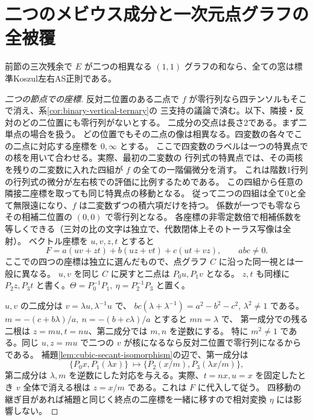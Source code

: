\section{二つのメビウス成分と一次元点グラフの全被覆}
\label{sec:split-binary-pencil-charts}
\begin{theorem}\label{thm:split-binary-pencil-charts}
前節の三次残余で $E$ が二つの相異なる $(1,1)$ グラフの和なら、全ての窓は標準Koszul左右AS正則である。
\end{theorem}
\begin{proof}[二つの節点での座標]
反対二位置のある二点で $f$ が零行列なら四テンソルもそこで消え、系\ref{cor:binary-vertical-ternary}の
三支持の議論で済む。以下、隣接・反対のどの二位置にも零行列がないとする。
二成分の交点は長さ2である。まず二単点の場合を扱う。
どの位置でもその二点の像は相異なる。四変数の各々でこの二点に対応する座標を $0,\infty$ とする。
ここで四変数のラベルは一つの特異点での核を用いて合わせる。実際、最初の二変数の
行列式の特異点では、その両核を残りの二変数に入れた四組が $f$ の全ての一階偏微分を消す。
これは階数1行列の行列式の微分が左右核での評価に比例するためである。
この四組から任意の隣接二座標を取っても同じ特異点の移動となる。
従って二つの四組は全て0と全て無限遠になり、$f$ は二変数ずつの積六項だけを持つ。
係数が一つでも零ならその相補二位置の $(0,0)$ で零行列となる。
各座標の非零定数倍で相補係数を等しくできる（三対の比の文字は独立で、代数閉体上そのトーラス写像は全射）。
ベクトル座標を $u,v,z,t$ とすると
\[
 F=a(uv+zt)+b(uz+vt)+c(ut+vz),\qquad abc\ne0 .
\]
ここでの四つの座標は独立に選んだもので、点グラフ $C$ に沿った同一視とは一般に異なる。
$u,v$ を同じ $C$ に戻すと二点は $P_0 u,P_1 v$ となる。
$z,t$ も同様に $P_2 z,P_3 t$ と書く。$\Theta=P_0^{-1}P_1,\ \eta=P_2^{-1}P_3$ と置く。

$u,v$ の二成分は $v=\lambda u,\lambda^{-1}u$ で、
$bc(\lambda+\lambda^{-1})=a^2-b^2-c^2$, $\lambda^2\ne1$ である。
$m=-(c+b\lambda)/a,\ n=-(b+c\lambda)/a$ とすると $mn=\lambda$ で、
第一成分での残る二根は $z=mu,t=nu$、第二成分では $m,n$ を逆数にする。
特に $m^2\ne1$ である。同じ $u,z=mu$ で二つの $v$ が核になるなら反対二位置で零行列になるからである。
補題\ref{lem:cubic-secant-isomorphism}の辺で、第一成分は
\[
 \{P_0 x,P_1(\lambda x)\}\ \longmapsto \{P_2(x/m),P_3(\lambda x/m)\},
\]
第二成分は $\lambda,m$ を逆数にした対応を与える。実際、$t=nx,u=x$ を固定したとき
$v$ 全体で消える根は $z=x/m$ である。これは $F$ に代入して従う。
四移動の継ぎ目があれば補題と同じく終点の二座標を一緒に移すので相対変換 $\eta$ には影響しない。
\end{proof}

